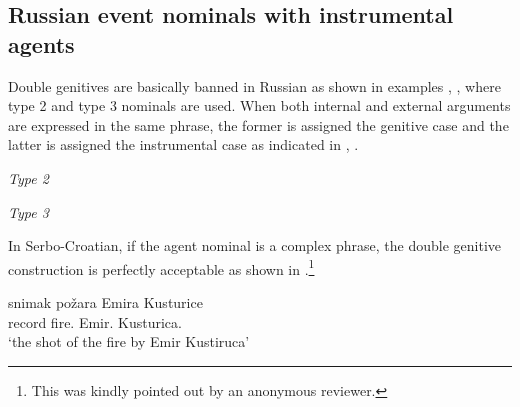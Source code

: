 \documentclass[output=paper,
]{langscibook}
\begin{document}
\subsection{Russian event nominals with instrumental agents}


Double genitives are basically banned in Russian as shown in examples , , where type 2 and type 3 nominals are used.
When both internal and external arguments are expressed in the same phrase, the former is assigned the genitive case and the latter is assigned the instrumental case as indicated in , .

\begin{exe}
\ex\label{ispG} \textit{Type 2}
\begin{xlist}
 \hfill\citep[162]{Ljutikova2016}
\end{xlist}
\end{exe}

\begin{exe}
\ex\label{razG} \textit{Type 3}
\begin{xlist}

{}
\end{xlist}
\end{exe}

\noindent In Serbo-Croatian, if the agent nominal is a complex phrase, the double genitive construction is perfectly acceptable as shown in .\footnote{
			This was kindly pointed out by an anonymous reviewer.}

\begin{exe}
\ex\label{dgsc} %
\gll snimak požara Emira Kusturice\\
	record fire.{\GEN} Emir.{\GEN} Kusturica.{\GEN}\\
\trans `the shot of the fire by Emir Kustiruca'
\end{exe}
\end{document}
